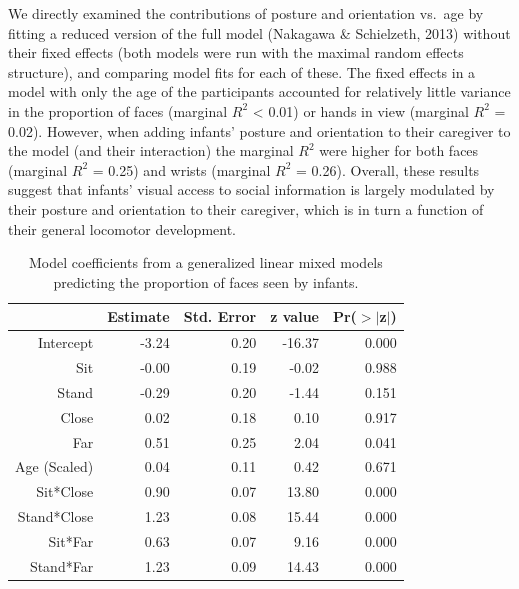 \documentclass[english,man]{apa6}
\begin{document}
We directly examined the contributions of posture and orientation
vs.~age by fitting a reduced version of the full model (Nakagawa \&
Schielzeth, 2013) without their fixed effects (both models were run with
the maximal random effects structure), and comparing model fits for each
of these. The fixed effects in a model with only the age of the
participants accounted for relatively little variance in the proportion
of faces (marginal \(R^2\) \textless{} 0.01) or hands in view (marginal
\(R^2\) = 0.02). However, when adding infants' posture and orientation
to their caregiver to the model (and their interaction) the marginal
\(R^2\) were higher for both faces (marginal \(R^2\) = 0.25) and wrists
(marginal \(R^2\) = 0.26). Overall, these results suggest that infants'
visual access to social information is largely modulated by their
posture and orientation to their caregiver, which is in turn a function
of their general locomotor development.

\begin{table}[ht]
\centering
\begin{tabular}{rrrrr}
  \hline
 & Estimate & Std. Error & z value & Pr($>$$|$z$|$) \\ 
  \hline
Intercept & -3.24 & 0.20 & -16.37 & 0.000 \\ 
  Sit & -0.00 & 0.19 & -0.02 & 0.988 \\ 
  Stand & -0.29 & 0.20 & -1.44 & 0.151 \\ 
  Close & 0.02 & 0.18 & 0.10 & 0.917 \\ 
  Far & 0.51 & 0.25 & 2.04 & 0.041 \\ 
  Age (Scaled) & 0.04 & 0.11 & 0.42 & 0.671 \\ 
  Sit*Close & 0.90 & 0.07 & 13.80 & 0.000 \\ 
  Stand*Close & 1.23 & 0.08 & 15.44 & 0.000 \\ 
  Sit*Far & 0.63 & 0.07 & 9.16 & 0.000 \\ 
  Stand*Far & 1.23 & 0.09 & 14.43 & 0.000 \\ 
   \hline
\end{tabular}
\caption{Model coefficients from a generalized linear mixed models predicting the proportion of faces seen by infants.} 
\end{table}
\end{document}
